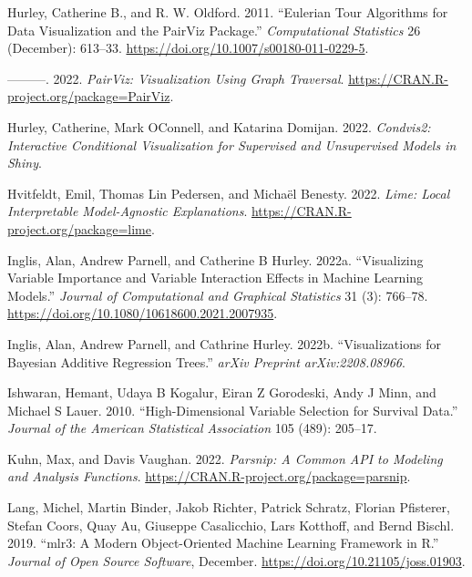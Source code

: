 \begin{CSLReferences}{1}{0}
\leavevmode{}%
Hurley, Catherine B., and R. W. Oldford. 2011. {``Eulerian Tour Algorithms for Data Visualization and the PairViz Package.''} \emph{Computational Statistics} 26 (December): 613--33. \url{https://doi.org/10.1007/s00180-011-0229-5}.

\leavevmode{}%
---------. 2022. \emph{PairViz: Visualization Using Graph Traversal}. \url{https://CRAN.R-project.org/package=PairViz}.

\leavevmode{}%
Hurley, Catherine, Mark OConnell, and Katarina Domijan. 2022. \emph{Condvis2: Interactive Conditional Visualization for Supervised and Unsupervised Models in Shiny}.

\leavevmode{}%
Hvitfeldt, Emil, Thomas Lin Pedersen, and Michaël Benesty. 2022. \emph{Lime: Local Interpretable Model-Agnostic Explanations}. \url{https://CRAN.R-project.org/package=lime}.

\leavevmode{}%
Inglis, Alan, Andrew Parnell, and Catherine B Hurley. 2022a. {``Visualizing Variable Importance and Variable Interaction Effects in Machine Learning Models.''} \emph{Journal of Computational and Graphical Statistics} 31 (3): 766--78. \url{https://doi.org/10.1080/10618600.2021.2007935}.

\leavevmode{}%
Inglis, Alan, Andrew Parnell, and Cathrine Hurley. 2022b. {``Visualizations for Bayesian Additive Regression Trees.''} \emph{arXiv Preprint arXiv:2208.08966}.

\leavevmode{}%
Ishwaran, Hemant, Udaya B Kogalur, Eiran Z Gorodeski, Andy J Minn, and Michael S Lauer. 2010. {``High-Dimensional Variable Selection for Survival Data.''} \emph{Journal of the American Statistical Association} 105 (489): 205--17.

\leavevmode{}%
Kuhn, Max, and Davis Vaughan. 2022. \emph{Parsnip: A Common API to Modeling and Analysis Functions}. \url{https://CRAN.R-project.org/package=parsnip}.

\leavevmode{}%
Lang, Michel, Martin Binder, Jakob Richter, Patrick Schratz, Florian Pfisterer, Stefan Coors, Quay Au, Giuseppe Casalicchio, Lars Kotthoff, and Bernd Bischl. 2019. {``{mlr3}: A Modern Object-Oriented Machine Learning Framework in {R}.''} \emph{Journal of Open Source Software}, December. \url{https://doi.org/10.21105/joss.01903}.


\end{CSLReferences}
